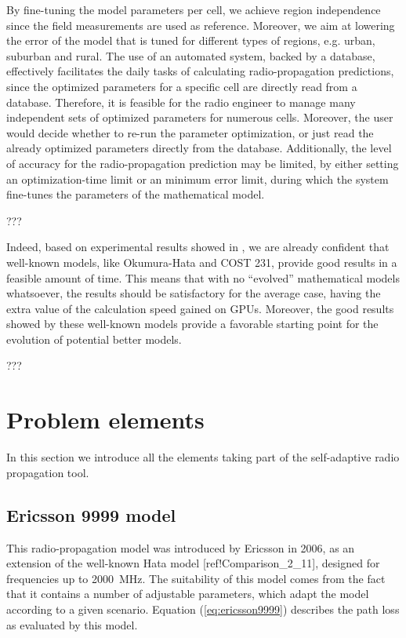 By fine-tuning the model parameters per cell, we achieve region independence
since the field measurements are used as reference. Moreover, we aim
at lowering the error of the model that is tuned for different types
of regions, e.g. urban, suburban and rural. The use of an automated
system, backed by a database, effectively facilitates the daily tasks
of calculating radio-propagation predictions, since the optimized
parameters for a specific cell are directly read from a database.
Therefore, it is feasible for the radio engineer to manage many independent
sets of optimized parameters for numerous cells. Moreover, the user
would decide whether to re-run the parameter optimization, or just
read the already optimized parameters directly from the database.
Additionally, the level of accuracy for the radio-propagation prediction
may be limited, by either setting an optimization-time limit or an
minimum error limit, during which the system fine-tunes the parameters
of the mathematical model.

???

Indeed, based on experimental results showed in \cite{Ozimek_Open.source.radio.coverage.prediction:2010},
we are already confident that well-known models, like Okumura-Hata
and COST 231, provide good results in a feasible amount of time. This
means that with no ``evolved'' mathematical models whatsoever, the
results should be satisfactory for the average case, having the extra
value of the calculation speed gained on GPUs. Moreover, the good
results showed by these well-known models provide a favorable starting
point for the evolution of potential better models.

???


\section{Problem elements}

In this section we introduce all the elements taking part of the self-adaptive
radio propagation tool.


\subsection{Ericsson 9999 model \label{sub:Ericsson-9999-model}}

This radio-propagation model was introduced by Ericsson in 2006, as
an extension of the well-known Hata model {[}ref!Comparison\_2\_11{]},
designed for frequencies up to 2000~MHz. The suitability of this
model comes from the fact that it contains a number of adjustable
parameters, which adapt the model according to a given scenario. Equation
(\ref{eq:ericsson9999}) describes the path loss as evaluated by this
model.

